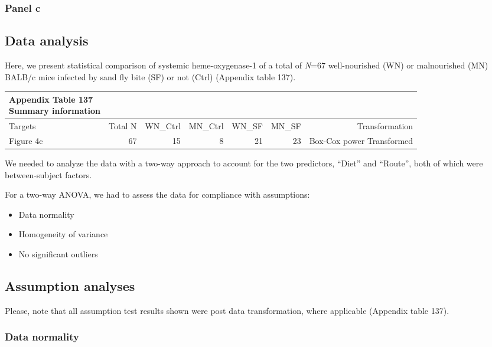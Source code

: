 \documentclass[
  12pt,
  letterpaper,
]{article}
\providecommand{\tightlist}{%
  \setlength{\itemsep}{0pt}\setlength{\parskip}{0pt}}
\begin{document}
\subsubsection{Panel c}\label{panel-c-2}

\subsection{Data analysis}\label{data-analysis-8}

Here, we present statistical comparison of systemic heme-oxygenase-1 of a total of \emph{N}=67 well-nourished (WN) or malnourished (MN) BALB/c mice infected by sand fly bite (SF) or not (Ctrl) (Appendix table 137).

\begingroup
\fontsize{12.0pt}{14.4pt}\selectfont
\begin{longtable}{l|rrrrrr}
\caption*{
{\large \textbf{Appendix Table 137}} \\ 
{\small \textbf{Summary information}}
} \\ 
\toprule
Targets & {Total N} & WN\_Ctrl & MN\_Ctrl & WN\_SF & MN\_SF & {Transformation} \\ 
\midrule\addlinespace[2.5pt]
Figure 4c & 67 & 15 & 8 & 21 & 23 & Box-Cox power Transformed \\ 
\bottomrule
\end{longtable}
\endgroup

We needed to analyze the data with a two-way approach to account for the two predictors, ``Diet'' and ``Route'', both of which were between-subject factors.

For a two-way ANOVA, we had to assess the data for compliance with assumptions:

\begin{itemize}
\tightlist
\item
  Data normality
\item
  Homogeneity of variance
\item
  No significant outliers
\end{itemize}

\subsection{Assumption analyses}\label{assumption-analyses-4}

Please, note that all assumption test results shown were post data transformation, where applicable (Appendix table 137).

\subsubsection{Data normality}\label{data-normality-4}
\end{document}
